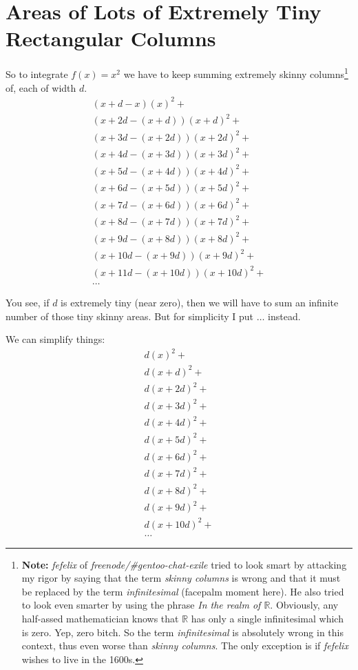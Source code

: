 \documentclass{report}
\begin{document}
\section{Areas of Lots of Extremely Tiny Rectangular Columns}
So to integrate $f(x) = x^2$ we have to keep summing extremely skinny
columns\footnote{\textbf{Note:} \emph{fefelix} of
\emph{freenode/\#gentoo-chat-exile} tried to look smart by attacking my rigor
by saying that the term \emph{skinny columns} is wrong and that it must be
replaced by the term \emph{infinitesimal} (facepalm moment here). He also tried
to look even smarter by using the phrase \emph{In the realm of $\mathbb{R}$}.
Obviously, any half-assed mathematician knows that $\mathbb{R}$ has only a
single infinitesimal which is zero. Yep, zero bitch. So the term
\emph{infinitesimal} is absolutely wrong in this context, thus even worse than
\emph{skinny columns}. The only exception is if \emph{fefelix} wishes to live
in the 1600s.} of, each of width $d$.
\[\begin{split}
  (x+d-x)(x)^2 + \\
  (x+2d-(x+d))(x+d)^2 + \\
  (x+3d-(x+2d))(x+2d)^2 + \\
  (x+4d-(x+3d))(x+3d)^2 + \\
  (x+5d-(x+4d))(x+4d)^2 + \\
  (x+6d-(x+5d))(x+5d)^2 + \\
  (x+7d-(x+6d))(x+6d)^2 + \\
  (x+8d-(x+7d))(x+7d)^2 + \\
  (x+9d-(x+8d))(x+8d)^2 + \\
  (x+10d-(x+9d))(x+9d)^2 + \\
  (x+11d-(x+10d))(x+10d)^2 + \\
  \ldots
\end{split}\]



You see, if $d$ is extremely tiny (near zero), then we will have to sum an
infinite number of those tiny skinny areas. But for simplicity I put $\ldots$
instead.

We can simplify things:
\[\begin{split}
  d(x)^2 + \\
  d(x+d)^2 + \\
  d(x+2d)^2 + \\
  d(x+3d)^2 + \\
  d(x+4d)^2 + \\
  d(x+5d)^2 + \\
  d(x+6d)^2 + \\
  d(x+7d)^2 + \\
  d(x+8d)^2 + \\
  d(x+9d)^2 + \\
  d(x+10d)^2 + \\
  \ldots
\end{split}\]
\end{document}

